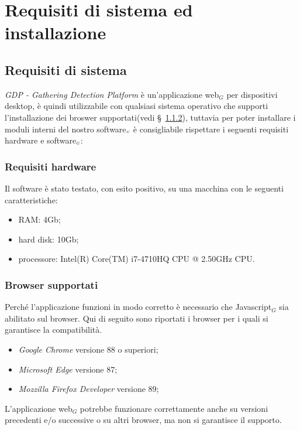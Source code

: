 \chapter{Requisiti di sistema ed installazione}\label{RequisitiDiSistemaEdInstallazione}

\section{Requisiti di sistema}\label{RequisitiDiSistemaEdInstallazioneRequisiti}
\textit{GDP - Gathering Detection Platform} è un'applicazione web$_G$ per dispositivi desktop, è quindi utilizzabile con qualsiasi sistema operativo che supporti l'installazione dei broswer supportati(vedi \S~\ref{RequisitiDiSistemaEdInstallazioneRequisitiBrowserSupportati}), tuttavia per poter installare i moduli interni del nostro software$_{\scaleto{G}{3pt}}$ è consigliabile rispettare i seguenti requisiti hardware e software$_{\scaleto{G}{3pt}}$:

\subsection{Requisiti hardware}\label{RequisitiDiSistemaEdInstallazioneRequisitiRequisitiHardware}

Il software è stato testato, con esito positivo, su una macchina con le seguenti caratteristiche:
\begin{itemize}
	\item RAM: 4Gb;
	\item hard disk: 10Gb;
	\item processore: Intel(R) Core(TM) i7-4710HQ CPU @ 2.50GHz CPU.
\end{itemize}

\subsection{Browser supportati}\label{RequisitiDiSistemaEdInstallazioneRequisitiBrowserSupportati}
Perché l'applicazione funzioni in modo corretto è necessario che Javascript$_G$ sia abilitato sul browser. 
Qui di seguito sono riportati i browser per i quali si garantisce la compatibilità. 
\begin{itemize}
	\item \textit{Google Chrome} versione 88 o superiori;
	\item \textit{Microsoft Edge} versione 87;
	\item \textit{Mozzilla Firefox Developer} versione 89;
\end{itemize}
L'applicazione web$_G$ potrebbe funzionare correttamente anche su versioni precedenti e/o successive o su altri browser, ma non si garantisce il supporto. 

